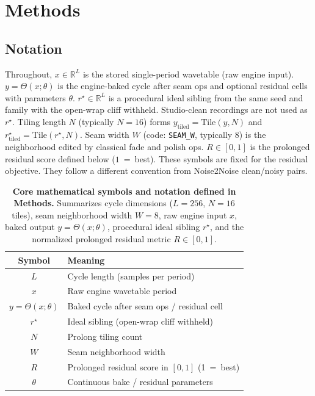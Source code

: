 \section{Methods}
\label{sec:methods}

\subsection{Notation}
\label{sec:notation}

Throughout, $x\in\mathbb{R}^{L}$ is the stored single-period wavetable (raw engine input).
$y=\Theta(x;\theta)$ is the engine-baked cycle after seam ops and optional residual cells with parameters $\theta$.
$r^{\star}\in\mathbb{R}^{L}$ is a procedural ideal sibling from the same seed and family with the open-wrap cliff withheld.
Studio-clean recordings are not used as $r^{\star}$.
Tiling length $N$ (typically $N{=}16$) forms $y_{\mathrm{tiled}}=\mathrm{Tile}(y,N)$ and $r^{\star}_{\mathrm{tiled}}=\mathrm{Tile}(r^{\star},N)$.
Seam width $W$ (code: \texttt{SEAM\_W}, typically $8$) is the neighborhood edited by classical fade and polish ops.
$R\in[0,1]$ is the prolonged residual score defined below ($1$~=~best).
These symbols are fixed for the residual objective. They follow a different convention from Noise2Noise clean/noisy pairs.

\begin{table}[t]
  \centering
  \caption{\textbf{Core mathematical symbols and notation defined in Methods.} Summarizes cycle dimensions ($L=256$, $N=16$ tiles), seam neighborhood width $W=8$, raw engine input $x$, baked output $y=\Theta(x;\theta)$, procedural ideal sibling $r^\star$, and the normalized prolonged residual metric $R\in[0,1]$.}
  \label{tab:symbols}
  \setlength{\tabcolsep}{3pt}
  \begin{tabular}{@{}cl@{}}
    \toprule
    Symbol & Meaning \\
    \midrule
    $L$ & Cycle length (samples per period) \\
    $x$ & Raw engine wavetable period \\
    $y=\Theta(x;\theta)$ & Baked cycle after seam ops / residual cell \\
    $r^{\star}$ & Ideal sibling (open-wrap cliff withheld) \\
    $N$ & Prolong tiling count \\
    $W$ & Seam neighborhood width \\
    $R$ & Prolonged residual score in $[0,1]$ (1~=~best) \\
    $\theta$ & Continuous bake / residual parameters \\
    \bottomrule
  \end{tabular}
\end{table}

